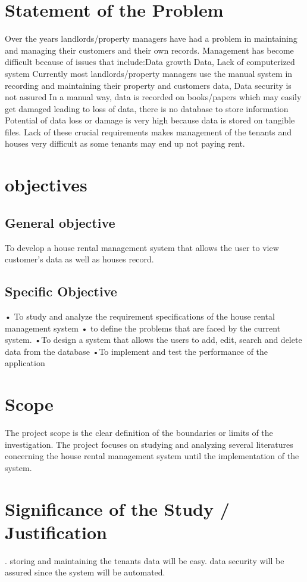 \documentclass[]{report}
\begin{document}
\section{Statement of the Problem} 
Over the years landlords/property managers have had a problem in maintaining and managing their customers and their own records. Management has become difficult because of issues that include:Data growth Data, Lack of computerized system Currently most landlords/property managers use the manual system in recording and maintaining their property and customers data, Data security is not assured In a manual way, data is recorded on books/papers which may easily get damaged leading to loss of data, there is no database to store information Potential of data loss or damage is very high because data is stored on tangible files. Lack of these crucial requirements makes management of the tenants and houses very difficult as some tenants may end up not paying rent. 


\section{objectives} 
\subsection{General objective}
To develop a house rental management system that allows the user to view customer’s data as well as houses record.


\subsection{Specific Objective}
• To study and analyze the requirement specifications of the house rental management system
• to define the problems that are faced by the current system.
•To design a system that allows the users to add, edit, search and delete data from the database 
•To implement and test the performance of the application

\section{Scope}
The project scope is the clear definition of the boundaries or limits of the investigation. The project focuses on studying and analyzing several literatures concerning the house rental management system until the implementation of the system. 

\section{Significance of the Study / Justification}.
storing and maintaining the tenants data will be easy.
data security will be assured since the system will be automated.
\end{document}

